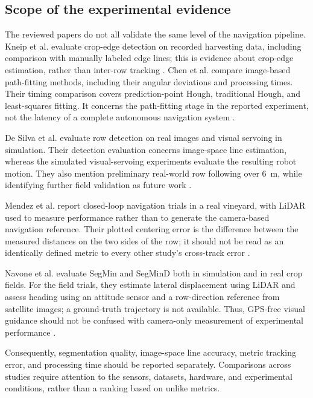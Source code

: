 \subsection{Scope of the experimental evidence}
\label{subsec:validation_scope}

The reviewed papers do not all validate the same level of the navigation
pipeline. Kneip et al. evaluate crop-edge detection on recorded harvesting
data, including comparison with manually labeled edge lines; this is
evidence about crop-edge estimation, rather than inter-row tracking
\cite[Section~8]{kneip2020cropedge}. Chen et al. compare image-based
path-fitting methods, including their angular deviations and processing
times. Their timing comparison covers prediction-point Hough, traditional
Hough, and least-squares fitting. It concerns the path-fitting stage in
the reported experiment, not the latency of a complete autonomous
navigation system \cite[Section~3.6, Tables~6--7]{chen2021navigation}.

De Silva et al. evaluate row detection on real images and visual servoing
in simulation. Their detection evaluation concerns image-space line
estimation, whereas the simulated visual-servoing experiments evaluate
the resulting robot motion. They
also mention preliminary real-world row following over 6~m, while
identifying further field validation as future work
\cite[Sections~5.2--5.3 and~6, Table~5]{silva2023rowdetection}.

Mendez et al. report closed-loop navigation trials in a real vineyard,
with LiDAR used to measure performance rather than to generate the
camera-based navigation reference. Their plotted centering error is the
difference between the measured distances on the two sides of the row;
it should not be read as an identically defined metric to every other
study's cross-track error \cite[Sections~3.6 and~4]{mendez2023vineyards}.

Navone et al. evaluate SegMin and SegMinD both in simulation and in
real crop fields. For the field trials, they estimate lateral
displacement using LiDAR and assess heading using an attitude sensor
and a row-direction reference from satellite images; a ground-truth
trajectory is not available. Thus, GPS-free visual guidance should not
be confused with camera-only measurement of experimental performance
\cite[Sections~4.3--4.4]{navone2025gpsfree}.

Consequently, segmentation quality, image-space line accuracy, metric
tracking error, and processing time should be reported separately.
Comparisons across studies require attention to the sensors, datasets,
hardware, and experimental conditions, rather than a ranking based on
unlike metrics.

